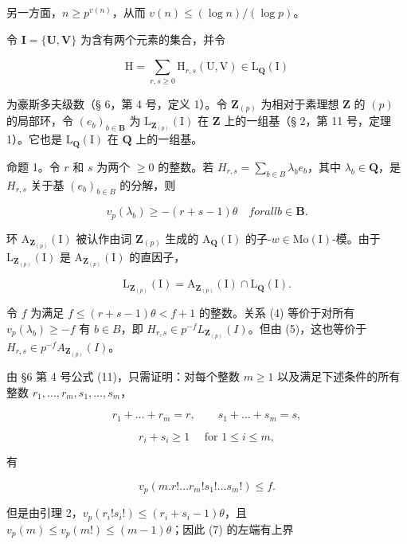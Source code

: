 另一方面，\(n \geqslant p^{v(n)}\)，从而 \(v(n) \leqslant (\log n) / (\log p)\)。

令 \(\mathbf{I} = \{\mathbf{U},\mathbf{V}\}\) 为含有两个元素的集合，并令

\[
\mathrm{H} = \sum_ {r, s \geqslant 0} \mathrm{H} _ {r, s} (\mathrm{U}, \mathrm{V}) \in \hat {\mathrm{L}} _ {\mathbf {Q}} (\mathrm{I})
\]

为豪斯多夫级数（§ 6，第 4 号，定义 1）。令 \(\mathbf{Z}_{(p)}\) 为相对于素理想 \(\mathbf{Z}\) 的 \((p)\) 的局部环，令 \((e_b)_{b \in \mathbf{B}}\) 为 \(\mathrm{L}_{\mathbf{Z}_{(p)}}(\mathrm{I})\) 在 \(\mathbf{Z}\) 上的一组基（§ 2，第 11 号，定理 1）。它也是 \(\mathrm{L}_{\mathbf{Q}}(\mathrm{I})\) 在 \(\mathbf{Q}\) 上的一组基。

命题 1。令 \(r\) 和 \(s\) 为两个 \(\geqslant 0\) 的整数。若 \(H_{r,s} = \sum_{b \in B} \lambda_b e_b\)，其中 \(\lambda_b \in \mathbf{Q}\)，是 \(H_{r,s}\) 关于基 \((e_b)_{b \in B}\) 的分解，则

\[
v _ {p} (\lambda_ {b}) \geqslant - (r + s - 1) \theta \quad for all b \in \mathbf {B}.\tag{4}
\]

环 \(\mathrm{A}_{\mathbf{Z}_{(p)}}(\mathrm{I})\) 被认作由词 \(\mathbf{Z}_{(p)}\) 生成的 \(\mathrm{A}_{\mathbf{Q}}(\mathrm{I})\) 的子-\(w \in \mathrm{Mo}(\mathrm{I})\)-模。由于 \(\mathrm{L}_{\mathbf{Z}_{(p)}}(\mathrm{I})\) 是 \(\mathrm{A}_{\mathbf{Z}_{(p)}}(\mathrm{I})\) 的直因子，

\[
\mathrm{L} _ {\mathbf {Z} _ {(p)}} (\mathrm{I}) = \mathrm{A} _ {\mathbf {Z} _ {(p)}} (\mathrm{I}) \cap \mathrm{L} _ {\mathbf {Q}} (\mathrm{I}).\tag{5}
\]

令 \(f\) 为满足 \(f \leqslant (r + s - 1)\theta < f + 1\) 的整数。关系 (4) 等价于对所有 \(v_{p}(\lambda_{b}) \geqslant -f\) 有 \(b \in B\)，即 \(H_{r,s} \in p^{-f}L_{\mathbf{Z}_{(p)}}(I)\)。但由 (5)，这也等价于 \(H_{r,s} \in p^{-f}A_{\mathbf{Z}_{(p)}}(I)\)。

由 §6 第 4 号公式 (11)，只需证明：对每个整数 \(m \geqslant 1\) 以及满足下述条件的所有整数 \(r_1, \ldots, r_m, s_1, \ldots, s_m\)，

\[
r _ {1} + \dots + r _ {m} = r, \qquad s _ {1} + \dots + s _ {m} = s,\tag{6}
\]

\[
r _ {i} + s _ {i} \geqslant 1 \quad \text { for } 1 \leqslant i \leqslant m,
\]

有

\[
v _ {p} (m. r! \dots r _ {m}! s _ {1}! \dots s _ {m}!) \leqslant f.\tag{7}
\]

但是由引理 2，\(v_{p}(r_{i}!s_{i}!) \leqslant (r_{i} + s_{i} - 1)\theta\)，且 \(v_{p}(m) \leqslant v_{p}(m!) \leqslant (m - 1)\theta\)；因此 (7) 的左端有上界

